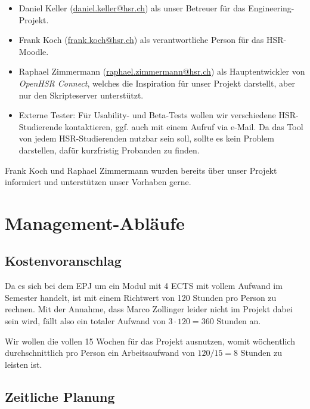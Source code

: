 \documentclass[a4paper]{article}
\let\oldsection\section
\renewcommand\section{\clearpage\oldsection}
\begin{document}

\begin{itemize}
  \item Daniel Keller (\url{daniel.keller@hsr.ch}) als unser Betreuer für das Engineering-Projekt.
  \item Frank Koch (\url{frank.koch@hsr.ch}) als verantwortliche Person für das HSR-Moodle.
  \item Raphael Zimmermann (\url{raphael.zimmermann@hsr.ch}) als Hauptentwickler
    von \emph{OpenHSR Connect}, welches die
    Inspiration für unser Projekt darstellt, aber nur den Skripteserver
    unterstützt.
  \item Externe Tester: Für Usability- und Beta-Tests wollen wir verschiedene
    HSR-Studierende kontaktieren, ggf. auch mit einem Aufruf via e-Mail. Da das
    Tool von jedem HSR-Studierenden nutzbar sein soll, sollte es kein Problem
    darstellen, dafür kurzfristig Probanden zu finden.
\end{itemize}

Frank Koch und Raphael Zimmermann wurden bereits über unser Projekt informiert
und unterstützen unser Vorhaben gerne.

\section{Management-Abläufe}
\subsection{Kostenvoranschlag}

Da es sich bei dem EPJ um ein Modul mit 4 ECTS mit vollem Aufwand im Semester handelt, ist mit einem Richtwert von 120 Stunden pro Person zu rechnen.
Mit der Annahme, dass Marco Zollinger leider nicht im Projekt dabei sein wird,
fällt also ein totaler Aufwand von $3 \cdot 120 = 360$ Stunden an.

Wir wollen die vollen 15 Wochen für das Projekt ausnutzen, womit wöchentlich
durchschnittlich pro Person ein Arbeitsaufwand von $120 / 15 = 8$ Stunden zu
leisten ist.


\pagebreak
\subsection{Zeitliche Planung}
\end{document}
